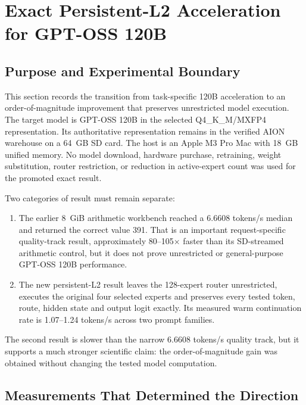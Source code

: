 
\section{Exact Persistent-L2 Acceleration for GPT-OSS 120B}
\label{sec:gptoss120b-persistent-l2}

\subsection{Purpose and Experimental Boundary}

This section records the transition from task-specific 120B acceleration to an
order-of-magnitude improvement that preserves unrestricted model execution.
The target model is GPT-OSS 120B in the selected Q4\_K\_M/MXFP4
representation.  Its authoritative representation remains in the verified
AION warehouse on a 64~GB SD card.  The host is an Apple M3 Pro Mac with
18~GB unified memory.  No model download, hardware purchase, retraining,
weight substitution, router restriction, or reduction in active-expert count
was used for the promoted exact result.

Two categories of result must remain separate:

\begin{enumerate}
  \item The earlier 8~GiB arithmetic workbench reached a 6.6608 tokens/s
  median and returned the correct value 391.  That is an important
  request-specific quality-track result, approximately 80--105$\times$ faster
  than its SD-streamed arithmetic control, but it does not prove unrestricted
  or general-purpose GPT-OSS 120B performance.
  \item The new persistent-L2 result leaves the 128-expert router unrestricted,
  executes the original four selected experts and preserves every tested token,
  route, hidden state and output logit exactly.  Its measured warm continuation
  rate is 1.07--1.24 tokens/s across two prompt families.
\end{enumerate}

The second result is slower than the narrow 6.6608 tokens/s quality track, but
it supports a much stronger scientific claim: the order-of-magnitude gain was
obtained without changing the tested model computation.

\subsection{Measurements That Determined the Direction}

